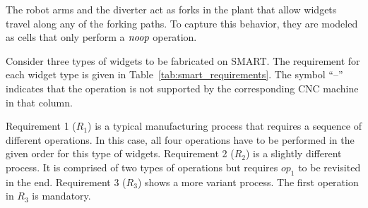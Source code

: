 
The robot arms and the diverter act as forks in the plant that allow widgets travel along any of the forking paths. To capture this behavior, they are modeled as cells that only perform a $\mathit{noop}$ operation.



Consider three types of widgets to be fabricated on SMART.
The requirement for each widget type is given in Table~\ref{tab:smart_requirements}.
The symbol ``--'' indicates that the operation is not supported by the corresponding CNC machine in that column.

Requirement 1 ($R_1$) is a typical manufacturing process that requires a sequence of different operations.
In this case, all four operations have to be performed in the given order for this type of widgets.
Requirement 2 ($R_2$) is a slightly different process. 
It is comprised of two types of operations but requires $op_1$ to be revisited in the end.
Requirement 3 ($R_3$) shows a more variant process.
The first operation in $R_3$ is mandatory.
 	